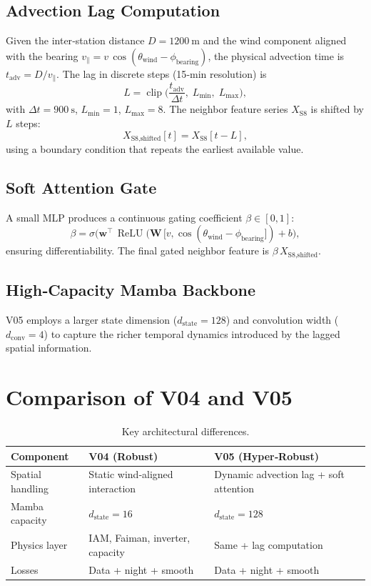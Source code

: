 \documentclass{article}
\begin{document}
\subsection{Advection Lag Computation}
Given the inter‑station distance $D=\SI{1200}{\meter}$ and the wind component aligned with the bearing $v_{\parallel}=v\,\cos(\theta_{\text{wind}}-\phi_{\text{bearing}})$, the physical advection time is $t_{\text{adv}}=D/v_{\parallel}$. The lag in discrete steps (15‑min resolution) is
\begin{equation}
  L = \operatorname{clip}\bigl(\frac{t_{\text{adv}}}{\Delta t},\;L_{\min},\;L_{\max}\bigr),
\end{equation}
with $\Delta t=\SI{900}{\second}$, $L_{\min}=1$, $L_{\max}=8$.
The neighbor feature series $X_{\text{S8}}$ is shifted by $L$ steps:
\begin{equation}
  X_{\text{S8,shifted}}[t] = X_{\text{S8}}[t-L],
\end{equation}
using a boundary condition that repeats the earliest available value.

\subsection{Soft Attention Gate}
A small MLP produces a continuous gating coefficient $\beta\in[0,1]$:
\begin{equation}
  \beta = \sigma\bigl(\mathbf{w}^{\top}\,\operatorname{ReLU}(\mathbf{W}\,[v,\cos(\theta_{\text{wind}}-\phi_{\text{bearing}}]) + b\bigr),
\end{equation}
ensuring differentiability. The final gated neighbor feature is $\beta\,X_{\text{S8,shifted}}$.

\subsection{High‑Capacity Mamba Backbone}
V05 employs a larger state dimension ($d_{\text{state}}=128$) and convolution width ($d_{\text{conv}}=4$) to capture the richer temporal dynamics introduced by the lagged spatial information.

\section{Comparison of V04 and V05}
\begin{table}[h]
\centering
\begin{tabular}{|l|l|l|}
\hline
Component & V04 (Robust) & V05 (Hyper‑Robust) \\
\hline
Spatial handling & Static wind‑aligned interaction & Dynamic advection lag + soft attention \\
\hline
Mamba capacity & $d_{\text{state}}=16$ & $d_{\text{state}}=128$ \\
\hline
Physics layer & IAM, Faiman, inverter, capacity & Same + lag computation \\
\hline
Losses & Data + night + smooth & Data + night + smooth \\
\hline
\end{tabular}
\caption{Key architectural differences.}
\end{table}
\end{document}
